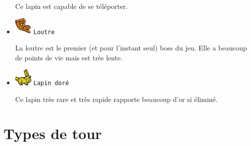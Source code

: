 \documentclass{article}
\begin{document}
\begin{itemize}
Ce lapin est capable de se t\'el\'eporter.

\item \includegraphics{otter.png} \texttt{Loutre}

La loutre est le premier (et pour l'instant seul) boss du jeu. Elle a beaucoup
de points de vie mais est tr\`es lente.

\item \includegraphics{goldenbunny_alt1.png} \texttt{Lapin dor\'e}

Ce lapin tr\`es rare et tr\`es rapide rapporte beaucoup d'or si \'elimin\'e.

\end{itemize}

\section{Types de tour}
\end{document}
